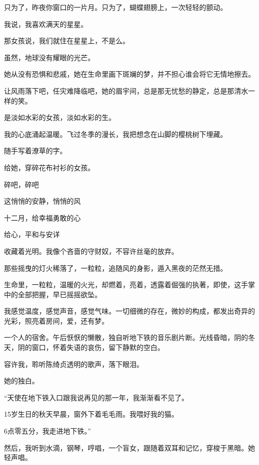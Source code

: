 		只为了，昨夜你窗口的一片月。只为了，蝴蝶翅膀上，一次轻轻的颤动。


		\vspace{1em}
		我说，我喜欢满天的星星。

		那女孩说，我们就住在星星上，不是么。

		虽然，地球没有耀眼的光芒。


		\vspace{1em}
		她从没有恐惧和悲戚，她在生命里画下斑斓的梦，并不担心谁会将它无情地擦去。

		让风雨落下吧，任灾难降临吧，她的眉宇间，总是那无忧愁的静定，总是那清水一样的笑。

		是淡如水彩的女孩，淡如水彩的生。


		\vspace{1em}
		我的心底涌起温暖。飞过冬季的漫长，我把想念在山脚的樱桃树下埋藏。

		随手写着潦草的字。

		给她，穿碎花布衬衫的女孩。


		\vspace{1em}
		碎吧，碎吧

		这悄悄的安静，悄悄的风

		十二月，给幸福勇敢的心

		给心，平和与安详

	\endwriting



		收藏着光明。我像个吝啬的守财奴，不容许丝毫的放弃。


		那些摇曳的灯火稀落了，一粒粒，追随风的身影，遁入黑夜的茫然无措。\par
		生命里，一粒粒，温暖的火光，却燃着，亮着，透露着倔强的执著，即使，这手掌中的全部把握，早已摇摇欲坠。

		我感觉温度，感觉声音，感觉气味。一切细微的存在，微妙的构成，都发出奇异的光彩，照亮着房间，爱，还有梦。\par
		一个人的宿舍。午后恹恹的懒散，独自听地下铁的音乐剧片断。光线昏暗，阴的冬天，阴的窗口，怀着失语的哀伤，留下静默的空白。\par
		容许我，聆听陈绮贞透明的歌声，落下眼泪。

		她的独白。

		“天使在地下铁入口跟我说再见的那一年，我渐渐看不见了。\par
		15岁生日的秋天早晨，窗外下着毛毛雨。我喂好我的猫。\par
		6点零五分，我走进地下铁。”

		然后，我听到水滴，钢琴，哼唱，一个盲女，跟随着双耳和记忆，穿梭于黑暗。她轻声唱。

